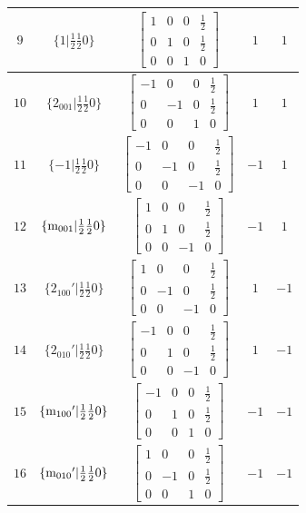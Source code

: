 \documentclass[fleqn,8pt]{jsarticle}
\begin{document}
\begin{longtable}{ccccc}
$ 9 $ & $ \{1|\frac{1}{2} \frac{1}{2} 0\} $ & $ \begin{bmatrix} 1 & 0 & 0 & \frac{1}{2} \\ 0 & 1 & 0 & \frac{1}{2} \\ 0 & 0 & 1 & 0 \end{bmatrix} $ & $ 1 $ & $ 1 $ \\ \hline
$ 10 $ & $ \{2{}_{001}|\frac{1}{2} \frac{1}{2} 0\} $ & $ \begin{bmatrix} -1 & 0 & 0 & \frac{1}{2} \\ 0 & -1 & 0 & \frac{1}{2} \\ 0 & 0 & 1 & 0 \end{bmatrix} $ & $ 1 $ & $ 1 $ \\ \hline
$ 11 $ & $ \{-1|\frac{1}{2} \frac{1}{2} 0\} $ & $ \begin{bmatrix} -1 & 0 & 0 & \frac{1}{2} \\ 0 & -1 & 0 & \frac{1}{2} \\ 0 & 0 & -1 & 0 \end{bmatrix} $ & $ -1 $ & $ 1 $ \\ \hline
$ 12 $ & $ \{{\rm m}_{001}|\frac{1}{2} \frac{1}{2} 0\} $ & $ \begin{bmatrix} 1 & 0 & 0 & \frac{1}{2} \\ 0 & 1 & 0 & \frac{1}{2} \\ 0 & 0 & -1 & 0 \end{bmatrix} $ & $ -1 $ & $ 1 $ \\ \hline
$ 13 $ & $ \{2{}_{100}{}'|\frac{1}{2} \frac{1}{2} 0\} $ & $ \begin{bmatrix} 1 & 0 & 0 & \frac{1}{2} \\ 0 & -1 & 0 & \frac{1}{2} \\ 0 & 0 & -1 & 0 \end{bmatrix} $ & $ 1 $ & $ -1 $ \\ \hline
$ 14 $ & $ \{2{}_{010}{}'|\frac{1}{2} \frac{1}{2} 0\} $ & $ \begin{bmatrix} -1 & 0 & 0 & \frac{1}{2} \\ 0 & 1 & 0 & \frac{1}{2} \\ 0 & 0 & -1 & 0 \end{bmatrix} $ & $ 1 $ & $ -1 $ \\ \hline
$ 15 $ & $ \{{\rm m}_{100}{}'|\frac{1}{2} \frac{1}{2} 0\} $ & $ \begin{bmatrix} -1 & 0 & 0 & \frac{1}{2} \\ 0 & 1 & 0 & \frac{1}{2} \\ 0 & 0 & 1 & 0 \end{bmatrix} $ & $ -1 $ & $ -1 $ \\ \hline
$ 16 $ & $ \{{\rm m}_{010}{}'|\frac{1}{2} \frac{1}{2} 0\} $ & $ \begin{bmatrix} 1 & 0 & 0 & \frac{1}{2} \\ 0 & -1 & 0 & \frac{1}{2} \\ 0 & 0 & 1 & 0 \end{bmatrix} $ & $ -1 $ & $ -1 $ \\
\end{longtable}
\end{document}
